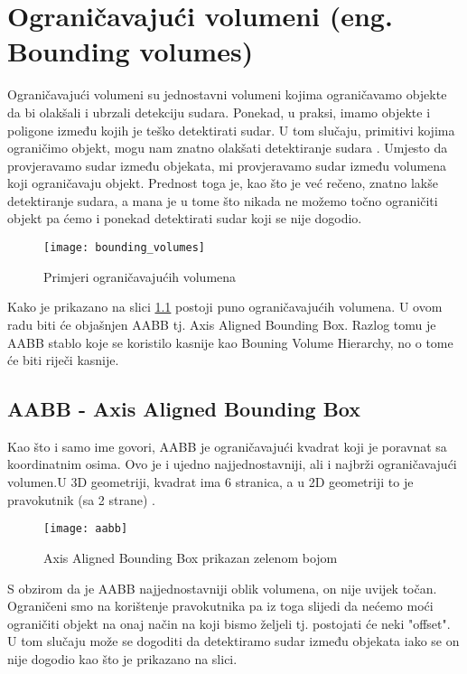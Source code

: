 \chapter {Ograničavajući volumeni (eng. Bounding volumes)}

Ograničavajući volumeni su jednostavni volumeni kojima ograničavamo objekte da bi olakšali i ubrzali detekciju sudara. Ponekad, u praksi, imamo objekte i poligone između kojih je teško detektirati sudar. U tom slučaju, primitivi kojima ograničimo objekt, mogu nam znatno olakšati detektiranje sudara \cite{1}. Umjesto da provjeravamo sudar između objekata, mi provjeravamo sudar između volumena koji ograničavaju objekt. Prednost toga je, kao što je već rečeno, znatno lakše detektiranje sudara, a mana je u tome što nikada ne možemo točno ograničiti objekt pa ćemo i ponekad detektirati sudar koji se nije dogodio.
\begin{figure}[!http]
	\begin{center}
		\texttt{[image: bounding\_volumes]}
		\caption{Primjeri ograničavajućih volumena}
		\label{fig:1}
	\end{center}
\end{figure}

Kako je prikazano na slici \ref{fig:1} postoji puno ograničavajućih volumena\cite{1}. U ovom radu biti će objašnjen AABB tj. Axis Aligned Bounding Box. Razlog tomu je AABB stablo koje se koristilo kasnije kao Bouning Volume Hierarchy, no o tome će biti riječi kasnije.

\section{AABB - Axis Aligned Bounding Box}

Kao što i samo ime govori, AABB je ograničavajući kvadrat koji je poravnat sa koordinatnim osima. Ovo je i ujedno najjednostavniji, ali i najbrži ograničavajući volumen\cite{1}.U 3D geometriji, kvadrat ima 6 stranica, a u 2D geometriji to je pravokutnik (sa 2 strane) \cite{1}. 
\begin{figure}[!http]
	\begin{center}
		\texttt{[image: aabb]}
		\caption{Axis Aligned Bounding Box prikazan zelenom bojom}
		\label{fig:2}
	\end{center}
\end{figure}

S obzirom da je AABB najjednostavniji oblik volumena, on nije uvijek točan. Ograničeni smo na korištenje pravokutnika pa iz toga slijedi da nećemo moći ograničiti objekt na onaj način na koji bismo željeli tj. postojati će neki "offset". U tom slučaju može se dogoditi da detektiramo sudar između objekata iako se on nije dogodio kao što je prikazano na slici.

